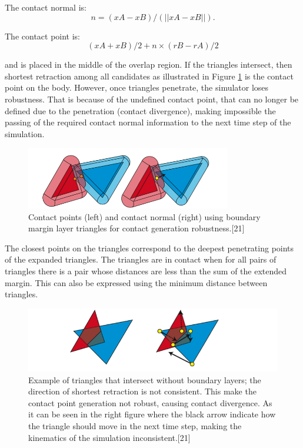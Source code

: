 \documentclass[times,12pt]{ACME2015article}
\begin{document}
The contact normal is: 
$$n = (xA - xB) / (||xA - xB||).$$ 

The contact point is: 
$$(xA + xB)/2 + n \times (rB-rA)/2$$

and is placed in the middle of the overlap region. If the triangles intersect, then shortest retraction among all candidates as illustrated in Figure \ref{fig7} is the contact point on the body. However, once triangles penetrate, the simulator loses robustness. That is because of the undefined contact point, that can no longer be defined due to the penetration (contact divergence), making impossible the passing of the required contact normal information to the next time step of the simulation. 

\begin{figure}[!h]
\centering
\includegraphics[width=0.8\textwidth]{contact2} \protect\caption{\label{fig7}Contact points (left) and contact normal (right) using boundary margin layer triangles for contact generation robustness.[21]}
\end{figure} 

The closest points on the triangles correspond to the deepest penetrating points of the expanded triangles. The triangles are in contact when for all pairs of triangles there is a pair whose distances are less than the sum of the extended margin. This can also be expressed using the minimum distance between triangles.

\begin{figure}[!h]
\centering
\includegraphics[width=1\textwidth]{contact3} \protect\caption{\label{fig8}Example of triangles that intersect without boundary layers; the direction of shortest retraction is not consistent. This make the contact point generation not robust, causing contact divergence. As it can be seen in the right figure where the black arrow indicate how the triangle should move in the next time step, making the kinematics of the simulation inconsistent.[21]}
\end{figure} 
\end{document}
